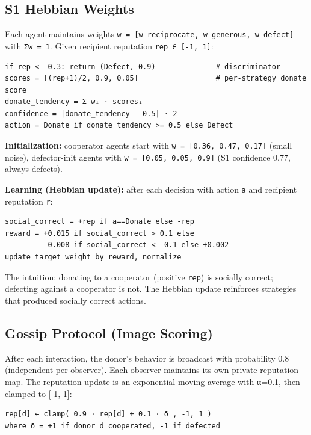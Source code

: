 \documentclass[
  11pt,
  letterpaper,
]{article}
\begin{document}
\subsection{S1 Hebbian Weights}\label{s1-hebbian-weights}

Each agent maintains weights
\texttt{w\ =\ {[}w\_reciprocate,\ w\_generous,\ w\_defect{]}} with
\texttt{Σw\ =\ 1}. Given recipient reputation
\texttt{rep\ ∈\ {[}-1,\ 1{]}}:

\begin{verbatim}
if rep < -0.3: return (Defect, 0.9)              # discriminator
scores = [(rep+1)/2, 0.9, 0.05]                  # per-strategy donate score
donate_tendency = Σ wᵢ · scoresᵢ
confidence = |donate_tendency - 0.5| · 2
action = Donate if donate_tendency >= 0.5 else Defect
\end{verbatim}

\textbf{Initialization:} cooperator agents start with
\texttt{w\ =\ {[}0.36,\ 0.47,\ 0.17{]}} (small noise), defector-init
agents with \texttt{w\ =\ {[}0.05,\ 0.05,\ 0.9{]}} (S1 confidence 0.77,
always defects).

\textbf{Learning (Hebbian update):} after each decision with action
\texttt{a} and recipient reputation \texttt{r}:

\begin{verbatim}
social_correct = +rep if a==Donate else -rep
reward = +0.015 if social_correct > 0.1 else
         -0.008 if social_correct < -0.1 else +0.002
update target weight by reward, normalize
\end{verbatim}

The intuition: donating to a cooperator (positive \texttt{rep}) is
socially correct; defecting against a cooperator is not. The Hebbian
update reinforces strategies that produced socially correct actions.

\subsection{Gossip Protocol (Image
Scoring)}\label{gossip-protocol-image-scoring}

After each interaction, the donor's behavior is broadcast with
probability 0.8 (independent per observer). Each observer maintains its
own private reputation map. The reputation update is an exponential
moving average with α=0.1, then clamped to {[}-1, 1{]}:

\begin{verbatim}
rep[d] ← clamp( 0.9 · rep[d] + 0.1 · δ , -1, 1 )
where δ = +1 if donor d cooperated, -1 if defected
\end{verbatim}
\end{document}
